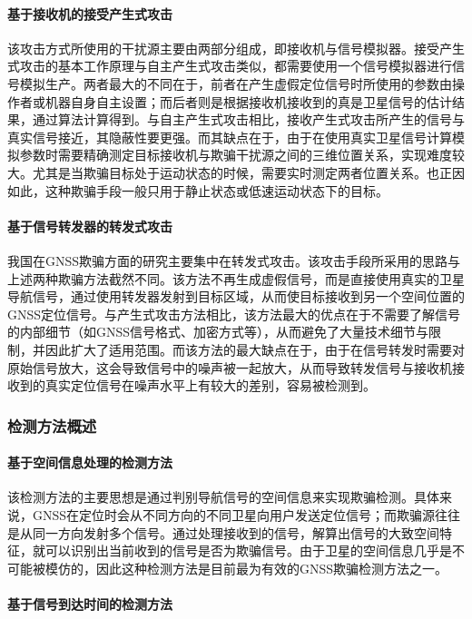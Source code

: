 \paragraph{基于接收机的接受产生式攻击}

该攻击方式所使用的干扰源主要由两部分组成，即接收机与信号模拟器。接受产生式攻击的基本工作原理与自主产生式攻击类似，都需要使用一个信号模拟器进行信号模拟生产。两者最大的不同在于，前者在产生虚假定位信号时所使用的参数由操作者或机器自身自主设置；而后者则是根据接收机接收到的真是卫星信号的估计结果，通过算法计算得到。与自主产生式攻击相比，接收产生式攻击所产生的信号与真实信号接近，其隐蔽性要更强。而其缺点在于，由于在使用真实卫星信号计算模拟参数时需要精确测定目标接收机与欺骗干扰源之间的三维位置关系，实现难度较大。尤其是当欺骗目标处于运动状态的时候，需要实时测定两者位置关系。也正因如此，这种欺骗手段一般只用于静止状态或低速运动状态下的目标\cite{庞晶2016GNSS}。
\paragraph{基于信号转发器的转发式攻击}
\label{par:zhuanfa}

我国在GNSS欺骗方面的研究主要集中在转发式攻击。该攻击手段所采用的思路与上述两种欺骗方法截然不同。该方法不再生成虚假信号，而是直接使用真实的卫星导航信号，通过使用转发器发射到目标区域，从而使目标接收到另一个空间位置的GNSS定位信号。与产生式攻击方法相比，该方法最大的优点在于不需要了解信号的内部细节（如GNSS信号格式、加密方式等），从而避免了大量技术细节与限制，并因此扩大了适用范围。而该方法的最大缺点在于，由于在信号转发时需要对原始信号放大，这会导致信号中的噪声被一起放大，从而导致转发信号与接收机接收到的真实定位信号在噪声水平上有较大的差别，容易被检测到\cite{庞晶2016GNSS}。
\subsubsection{检测方法概述}
\label{sec:jiance}
\paragraph{基于空间信息处理的检测方法}

该检测方法的主要思想是通过判别导航信号的空间信息来实现欺骗检测。具体来说，GNSS在定位时会从不同方向的不同卫星向用户发送定位信号；而欺骗源往往是从同一方向发射多个信号。通过处理接收到的信号，解算出信号的大致空间特征，就可以识别出当前收到的信号是否为欺骗信号。由于卫星的空间信息几乎是不可能被模仿的，因此这种检测方法是目前最为有效的GNSS欺骗检测方法之一\cite{周彦2022GNSS欺骗检测}。
\paragraph{基于信号到达时间的检测方法}

